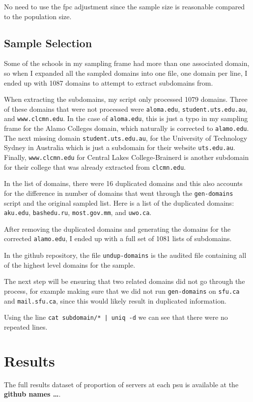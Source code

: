 \documentclass{article}
\theoremstyle{definition}
\begin{document}
\begin{flushleft}
No need to use the fpc adjustment since the sample size
is reasonable compared to the population size.


\subsection{Sample Selection}
Some of the schools in my sampling frame had more than one associated
domain, so when I expanded all the sampled domains into one file, one
domain per line, I ended up with 1087 domains to attempt to extract
subdomains from.

When extracting the subdomains, my script only processed 1079 domains.
Three of these domains that were not processed were \texttt{aloma.edu},
\texttt{student.uts.edu.au}, and \texttt{www.clcmn.edu}. In the case of
\texttt{aloma.edu}, this is just a typo in my sampling frame for the
Alamo Colleges domain, which naturally is corrected to \texttt{alamo.edu}.
The next missing domain \texttt{student.uts.edu.au}, for the University
of Technology Sydney in Australia which is just a subdomain for their
website \texttt{uts.edu.au}. Finally, \texttt{www.clcmn.edu} for
Central Lakes College-Brainerd is another subdomain for their college
that was already extracted from \texttt{clcmn.edu}.

In the list of domains, there were 16 duplicated domains and this
also accounts for the difference in number of domains that went
through the \texttt{gen-domains} script and the original sampled
list. Here is a list of the duplicated domains: \texttt{aku.edu},
\texttt{bashedu.ru}, \texttt{most.gov.mm}, and \texttt{uwo.ca}.

After removing the duplicated domains and generating the domains
for the corrected \texttt{alamo.edu}, I ended up with a full set
of 1081 lists of subdomains.

In the github repository, the file \texttt{undup-domains} is the audited file containing all
of the highest level domains for the sample.

The next step will be ensuring that two related domains did not go through
the process, for example making sure that we did not run \texttt{gen-domains}
on \texttt{sfu.ca} and \texttt{mail.sfu.ca}, since this would likely result in
duplicated information.

Using the line \texttt{cat subdomain/* | uniq -d} we can see that
there were no repeated lines.




\section{Results}
The full results dataset of proportion of servers at
each psu is available at the \textbf{github names \dots}.



\end{flushleft}
\end{document}
